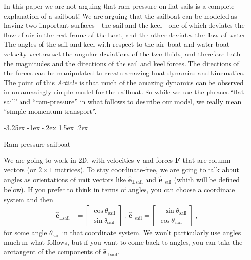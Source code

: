 \documentclass[letterpaper]{article}
\makeatletter
\renewcommand{\vec}[1]{\boldsymbol{#1}}
\newcommand{\uvec}{\vec{\hat{e}}}
\newcommand{\sail}{\text{sail}}
\newcommand{\documentname}{\textsl{Article}}
\renewcommand\section{\@startsection {section}{1}{\z@}%
  {-3.25ex \@plus -1ex \@minus -.2ex}%
  {1.5ex \@plus .2ex}%
  {\raggedright\normalfont\large\bfseries}}
\makeatother
\begin{document}
In this paper we are not arguing that ram pressure on flat sails is a complete explanation of a sailboat!
We are arguing that the sailboat can be modeled as having two important surfaces---the sail and the keel---one of which deviates the flow of air in the rest-frame of the boat, and the other deviates the flow of water.
The angles of the sail and keel with respect to the air--boat and water-boat velocity vectors set the angular deviations of the two fluids, and therefore both the magnitudes and the directions of the sail and keel forces.
The directions of the forces can be manipulated to create amazing boat dynamics and kinematics.
The point of this \documentname{} is that much of the amazing dynamics can be observed in an amazingly simple model for the sailboat.
So while we use the phrases ``flat sail'' and ``ram-pressure'' in what follows to describe our model, we really mean ``simple momentum transport''.

\section{Ram-pressure sailboat}\label{sec:boat}

We are going to work in 2D, with velocities $\vec{v}$ and forces $\vec{F}$ that are column vectors (or $2\times 1$ matrices).
To stay coordinate-free, we are going to talk about angles as orientations of unit vectors like $\uvec_{\perp\sail}$ and $\uvec_{\parallel\sail}$ (which will be defined below).
If you prefer to think in terms of angles, you can choose a coordinate system and then
\begin{align}
    \uvec_{\perp\sail} &= \begin{bmatrix}\cos\theta_\sail \\ \sin\theta_\sail\end{bmatrix} ~ ; ~ \uvec_{\parallel\sail} = \begin{bmatrix}-\sin\theta_\sail \\ \cos\theta_\sail\end{bmatrix} ~,
\end{align}
for some angle $\theta_\sail$ in that coordinate system.
We won't particularly use angles much in what follows, but if you want to come back to angles, you can take the arctangent of the components of $\uvec_{\perp\sail}$.
\end{document}
